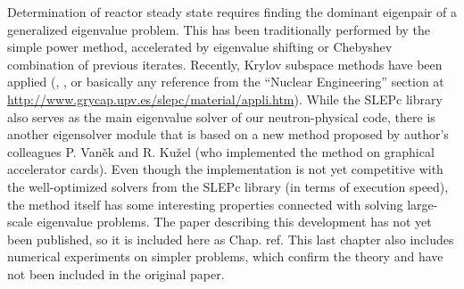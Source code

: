 Determination of reactor steady state requires finding the dominant eigenpair of a generalized eigenvalue problem. This
has been traditionally performed by the simple power method, accelerated by eigenvalue shifting or Chebyshev
combination of previous iterates. Recently, Krylov subspace methods have been applied (\cite{warsa}, \cite{Subramanian},
or basically any reference from the ``Nuclear Engineering'' section at
\url{http://www.grycap.upv.es/slepc/material/appli.htm}). While the SLEPc library also serves as the main eigenvalue
solver of our neutron-physical code, there is another eigensolver module that is based on a new method
proposed by author's colleagues P. Van{\v e}k and R. Ku{\v z}el (who implemented the method on graphical accelerator
cards). Even though the implementation is not yet competitive with the well-optimized
solvers from the SLEPc library (in terms of execution speed), the method itself has some interesting properties
connected with solving large-scale eigenvalue problems. The paper describing this development has not yet been 
published, so it is included here as Chap. \alert{ref}. This last chapter also includes numerical experiments on simpler
problems, which confirm the theory and have not been included in the original paper.


